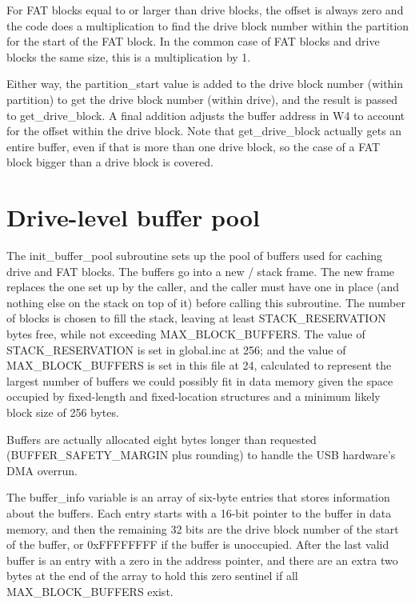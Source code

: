For FAT blocks equal to or larger than drive blocks, the offset is always
zero and the code does a multiplication to find the drive block number
within the partition for the start of the FAT block.  In the common case of
FAT blocks and drive blocks the same size, this is a multiplication by 1.

Either way, the partition\_start value is added to the drive block number
(within partition) to get the drive block number (within drive), and the
result is passed to get\_drive\_block.  A final addition adjusts the buffer
address in W4 to account for the offset within the drive block.  Note that
get\_drive\_block actually gets an entire buffer, even if that is more
than one drive block, so the case of a FAT block bigger than a drive block
is covered.

\section{Drive-level buffer pool}

The init\_buffer\_pool subroutine sets up the pool of buffers used for
caching drive and FAT blocks.  The buffers go into a new
/ stack frame.  The new frame replaces the one set up
by the caller, and the caller must have one in place (and nothing else on
the stack on top of it) before calling this subroutine.  The number of
blocks is chosen to fill the stack, leaving at least STACK\_RESERVATION
bytes free, while not exceeding MAX\_BLOCK\_BUFFERS.  The value of
STACK\_RESERVATION is set in global.inc at 256; and the value of
MAX\_BLOCK\_BUFFERS is set in this file at 24, calculated to represent the
largest number of buffers we could possibly fit in data memory given the
space occupied by fixed-length and fixed-location structures and a minimum
likely block size of 256 bytes.

Buffers are actually allocated eight bytes longer than requested
(BUFFER\_SAFETY\_MARGIN plus rounding) to handle the USB hardware's DMA
overrun.

The buffer\_info variable is an array of six-byte entries that stores
information about the buffers.  Each entry starts with a 16-bit pointer to
the buffer in data memory, and then the remaining 32 bits are the drive
block number of the start of the buffer, or 0xFFFFFFFF if the buffer is
unoccupied.  After the last valid buffer is an entry with a zero in the
address pointer, and there are an extra two bytes at the end of the array to
hold this zero sentinel if all MAX\_BLOCK\_BUFFERS exist.

